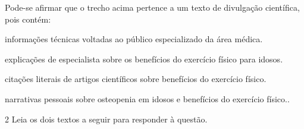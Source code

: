 Pode-se afirmar que o trecho acima pertence a um texto de divulgação científica, pois contém:

\begin{escolha}
  
  \item informações técnicas voltadas ao público especializado da área médica.
  
  \item explicações de especialista sobre os benefícios do exercício físico para idosos.
  
  \item citações literais de artigos científicos sobre benefícios do exercício físico.
  
  \item narrativas pessoais sobre osteopenia em idosos e benefícios do exercício físico..

\end{escolha}

\num{2} Leia os dois textos a seguir para responder à questão. 

